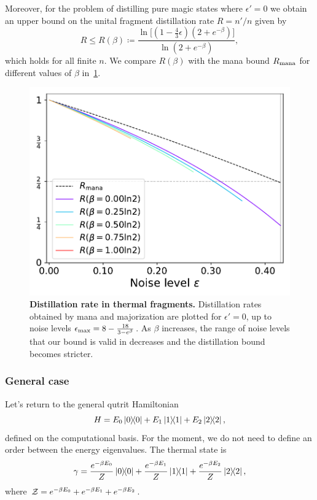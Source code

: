 \documentclass[pra,
aps,
twocolumn,
superscriptaddress,
groupedaddress,
nofootinbib,
reprint
]{revtex4-1}
\begin{document}
Moreover, for the problem of distilling pure magic states where $\epsilon'=0$ we obtain an upper bound on the unital fragment distillation rate $R=n'/n$ given by
\begin{equation}
	R \leq R(\beta) \coloneqq \frac{\ln{\Big[ (1-\frac{4}{3}\epsilon)(2+e^{-\beta}) \Big]}}{\ln{(2+e^{-\beta})}},
\end{equation}
which holds for all finite $n$. 
We compare $R(\beta)$ with the mana bound $R_{\rm{mana}}$ for different values of $\beta$ in~\cref{fig:distill_bounds_temp}.
\begin{figure}[h]
    \centering
    \includegraphics[scale=0.5]{figs/distill_bounds_temp.pdf}
    \caption{\textbf{Distillation rate in thermal fragments.} Distillation rates obtained by mana and majorization are plotted for $\epsilon' = 0$, up to noise levels $\epsilon_{\rm{max}} = 8-\frac{18}{3-e^{\beta}}$.
    As $\beta$ increases, the range of noise levels that our bound is valid in decreases and the distillation bound becomes stricter.
    }
    \label{fig:distill_bounds_temp}
\end{figure}

\subsubsection{General case}

Let's return to the general qutrit Hamiltonian
\begin{equation}\label{eq:h_thermal_general}
	H = E_0 \ketbra{0} + E_1 \ketbra{1} + E_2 \ketbra{2},
\end{equation}
defined on the computational basis.
For the moment, we do not need to define an order between the energy eigenvalues.
The thermal state is
\begin{equation}
	\gamma = \frac{e^{-\beta E_0}}{Z}\ketbra{0} + \frac{e^{-\beta E_1}}{Z}\ketbra{1} + \frac{e^{-\beta E_2}}{Z}\ketbra{2},
\end{equation}
where $\mathcal{Z} = e^{-\beta E_0} + e^{-\beta E_1} + e^{-\beta E_2}$.
\end{document}
